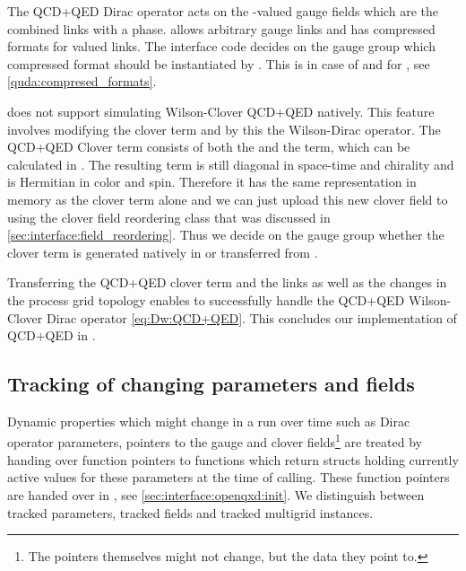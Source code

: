 The QCD+QED Dirac operator acts on the -valued gauge fields which are the combined  links with a  phase. \Quda allows arbitrary gauge links and has compressed formats for  valued links. The interface code decides on the gauge group which compressed format should be instantiated by \quda. This is  in case of  and  for , see \cref{quda:compresed_formats}.

\Quda does not support simulating Wilson-Clover QCD+QED natively.
This feature involves modifying the clover term and by this the Wilson-Dirac operator.
The QCD+QED Clover term consists of both the  and the  term, which can be calculated in \openqxd.
The resulting term is still diagonal in space-time and chirality and is Hermitian in color and spin.
Therefore it has the same representation in memory as the  clover term alone and we can just upload this new clover field to \quda using the clover field reordering class that was discussed in \cref{sec:interface:field_reordering}.
Thus we decide on the gauge group whether the clover term is generated natively in \quda or transferred from \openqxd.

Transferring the QCD+QED clover term and the  links as well as the changes in the process grid topology enables \quda to successfully handle the QCD+QED Wilson-Clover Dirac operator \cref{eq:Dw:QCD+QED}.
This concludes our implementation of QCD+QED in \quda.

\subsection{Tracking of changing parameters and fields}
\label{sec:interface:track_params}


Dynamic properties which might change in a run over time such as
  Dirac operator parameters,
  pointers to the gauge and clover fields\footnote{The pointers themselves might not change, but the data they point to.}
are treated by handing over function pointers to functions which return structs holding currently active values for these parameters at the time of calling. These function pointers are handed over in , see \cref{sec:interface:openqxd:init}. We distinguish between tracked parameters, tracked fields and tracked multigrid instances.

